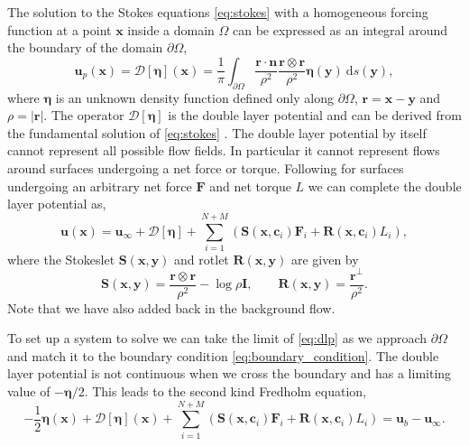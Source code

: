 \documentclass[preprint, 10pt]{elsarticle}
\begin{document}
The solution to the Stokes equations \eqref{eq:stokes} with a homogeneous forcing function at a point $\mathbf{x}$ inside a domain $\Omega$ can be expressed as an integral around the boundary of the domain $\partial\Omega$,
\begin{equation}\label{eq:dlp}\mathbf{u}_p(\mathbf{x}) = \mathcal{D}[\pmb{\eta}](\mathbf{x}) = \frac{1}{\pi}\int_{\partial\Omega} \frac{\mathbf{r}\cdot\mathbf{n}}{\rho^2}\frac{\mathbf{r}\otimes\mathbf{r}}{\rho^2}\pmb{\eta}(\mathbf{y})~\text{d}s(\mathbf{y}),\end{equation}
where $\pmb{\eta}$ is an unknown density function defined only along $\partial\Omega$, $\mathbf{r}=\mathbf{x}-\mathbf{y}$ and $\rho=|\mathbf{r}|$. The operator $\mathcal{D}[\pmb{\eta}]$ is the double layer potential and can be derived from the fundamental solution of \eqref{eq:stokes} \cite{Ladyzhenskaya1963, Pozrikidis1992}. The double layer potential by itself cannot represent all possible flow fields. In particular it cannot represent flows around surfaces undergoing a net force or torque. Following \cite{Power1987, Power1993} for surfaces undergoing an arbitrary net force $\mathbf{F}$ and net torque $L$ we can complete the double layer potential as,
\[ \mathbf{u}(\mathbf{x}) = \mathbf{u}_{\infty} +  \mathcal{D}[\pmb{\eta}] + \sum\limits_{i=1}^{N+M} \left(\mathbf{S}(\mathbf{x},\mathbf{c}_i)\mathbf{F}_i + \mathbf{R}(\mathbf{x},\mathbf{c}_i)L_i\right),\]
where the Stokeslet $\mathbf{S}(\mathbf{x},\mathbf{y})$ and rotlet $\mathbf{R}(\mathbf{x},\mathbf{y})$ are given by
\[ \mathbf{S}(\mathbf{x},\mathbf{y}) = \frac{\mathbf{r}\otimes\mathbf{r}}{\rho^2} - \log\rho\mathbf{I},\qquad \mathbf{R}(\mathbf{x},\mathbf{y}) = \frac{\mathbf{r}^\perp}{\rho^2}.\]
Note that we have also added back in the background flow.

 To set up a system to solve we can take the limit of \eqref{eq:dlp} as we approach $\partial\Omega$ and match it to the boundary condition \eqref{eq:boundary_condition}. The double layer potential is not continuous when we cross the boundary and has a limiting value of $-\pmb{\eta}/2$. This leads to the second kind Fredholm equation,
\begin{equation}\label{eq:vel_walls} -\frac{1}{2}\pmb{\eta}(\mathbf{x}) + \mathcal{D}[\pmb{\eta}](\mathbf{x}) + \sum\limits_{i=1}^{N+M} \left(\mathbf{S}(\mathbf{x},\mathbf{c}_i)\mathbf{F}_i + \mathbf{R}(\mathbf{x},\mathbf{c}_i)L_i\right) = \mathbf{u}_b - \mathbf{u}_\infty.\end{equation}
\end{document}
